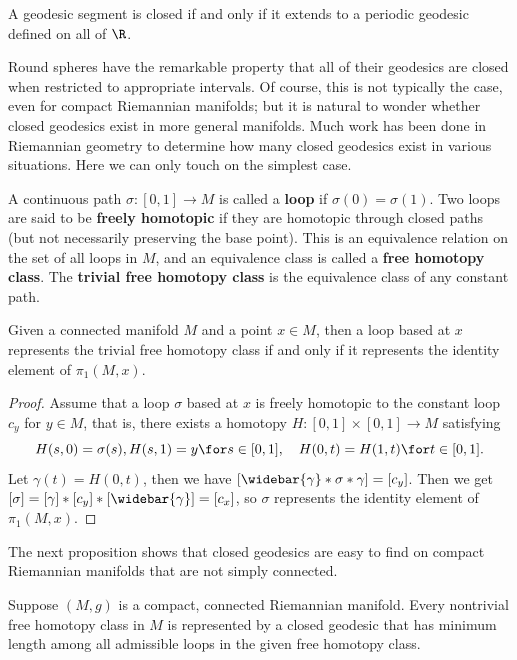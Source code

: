 \begin{proposition}
A geodesic segment is closed if and only if it extends to a periodic geodesic defined on all of $\R$.
\end{proposition}
Round spheres have the remarkable property that all of their geodesics are closed when restricted to appropriate intervals. Of course, this is not typically the case, even 
for compact Riemannian manifolds; but it is natural to wonder whether closed geodesics exist in more general manifolds. Much work has been done in Riemannian geometry to 
determine how many closed geodesics exist in various situations. Here we can only touch on the simplest case.\par
A continuous path $\sigma:[0,1]\to M$ is called a \textbf{loop} if $\sigma(0)=\sigma(1)$. Two loops are said to be \textbf{freely homotopic} if they are homotopic 
through closed paths (but not necessarily preserving the base point). This is an equivalence relation on the set of all loops in $M$, and an equivalence class is 
called a \textbf{free homotopy class}. The \textbf{trivial free homotopy class} is the equivalence class of any constant path.
\begin{lemma}
Given a connected manifold $M$ and a point $x\in M$, then a loop based at $x$ represents the trivial free homotopy class if and only if it represents the identity 
element of $\pi_1(M,x)$.
\end{lemma}
\begin{proof}
Assume that a loop $\sigma$ based at $x$ is freely homotopic to the constant loop $c_y$ for $y\in M$, that is, there exists a homotopy $H:[0,1]\times[0,1]\to M$ satisfying
\[H(s,0)=\sigma(s),H(s,1)=y\for s\in[0,1],\quad H(0,t)=H(1,t) \for t\in[0,1].\]
Let $\gamma(t)=H(0,t)$, then we have $[\widebar{\gamma}\ast\sigma\ast\gamma]=[c_y]$. Then we get $[\sigma]=[\gamma]\ast[c_y]\ast[\widebar{\gamma}]=[c_x]$, so $\sigma$ represents the identity element of $\pi_1(M,x)$.
\end{proof}
The next proposition shows that closed geodesics are easy to find on compact Riemannian manifolds that are not simply connected.
\begin{proposition}
Suppose $(M,g)$ is a compact, connected Riemannian manifold. Every nontrivial free homotopy class in $M$ is represented by a closed geodesic that has minimum length among all admissible loops in the given free homotopy class.
\end{proposition}
